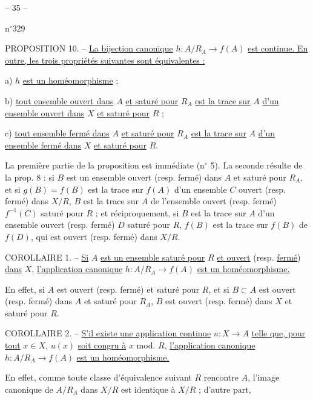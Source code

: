 \begin{center}-- 35 --\end{center}
\hfill n$^{\circ}$329

PROPOSITION 10. -- \uline{La bijection canonique} $h:A/R_A\to f(A)$ \uline{est continue. En outre, les trois propriétés suivantes sont équivalentes :}

a) $h$ \uline{est un homéomorphisme} ;

b) \uline{tout ensemble ouvert dans} $A$ \uline{et saturé pour} $R_A$ \uline{est la trace sur} $A$ \uline{d'un ensemble ouvert dans} $X$ \uline{et saturé pour} $R$ ;

c) \uline{tout ensemble fermé dans} $A$ \uline{et saturé pour} $R_A$ \uline{est la trace sur} $A$ \uline{d'un ensemble fermé dans} $X$ \uline{et saturé pour} $R$.

La première partie de la proposition est immédiate (n$^{\circ}$ 5). La seconde résulte de la prop. 8 : si $B$ est un ensemble ouvert (resp. fermé) dans $A$ et saturé pour $R_A$, et si $g(B)=f(B)$ est la trace sur $f(A)$ d'un ensemble $C$ ouvert (resp. fermé) dans $X/R$, $B$ est la trace sur $A$ de l'ensemble ouvert (resp. fermé) $f^{-1}(C)$ saturé pour $R$ ; et réciproquement, si $B$ est la trace sur $A$ d'un ensemble ouvert (resp. fermé) $D$ saturé pour $R$, $f(B)$ est la trace sur $f(B)$ de $f(D)$, qui est ouvert (resp. fermé) dans $X/R$.

COROLLAIRE 1. -- \uline{Si} $A$ \uline{est un ensemble saturé pour} $R$ \uline{et ouvert} (resp. \uline{fermé}) \uline{dans} $X$, \uline{l'application canonique} $h:A/R_A\to f(A)$ \uline{est un homéomorphisme.}

En effet, si $A$ est ouvert (resp. fermé) et saturé pour $R$, et si $B\subset A$ est ouvert (resp. fermé) dans $A$ et saturé pour $R_A$, $B$ est ouvert (resp. fermé) dans $X$ et saturé pour $R$.

COROLLAIRE 2. -- \uline{S'il existe une application continue} $u:X\to A$ \uline{telle que, pour tout} $x\in X$, $u(x)$ \uline{soit congru à} $x$ mod. $R$, \uline{l'application canonique} $h:A/R_A\to f(A)$ \uline{est un homéomorphisme.}

En effet, comme toute classe d'équivalence suivant $R$ rencontre $A$, l'image canonique de $A/R_A$ dans $X/R$ est identique à $X/R$ ; d'autre part,
